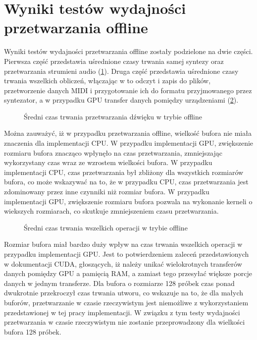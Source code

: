 \section{Wyniki testów wydajności przetwarzania offline}
Wyniki testów wydajności przetwarzania offline zostały podzielone na dwie części. Pierwsza część przedstawia uśrednione czasy trwania samej syntezy oraz przetwarzania strumieni audio (\ref{fig:Średni czas trwania przetwarzania dźwięku w trybie offline}). Druga część przedstawia uśrednione czasy trwania wszelkich obliczeń, włączając w to odczyt i zapis do plików, przetworzenie danych MIDI i przygotowanie ich do formatu przyjmowanego przez syntezator, a w przypadku GPU transfer danych pomiędzy urządzeniami (\ref{fig:Średni czas trwania wszelkich operacji w trybie offline}).

\begin{figure}[H]
    \centering
    \scalebox{1.0}{}
    \caption{Średni czas trwania przetwarzania dźwięku w trybie offline}
    \label{fig:Średni czas trwania przetwarzania dźwięku w trybie offline}
\end{figure}

Można zauważyć, iż w przypadku przetwarzania offline, wielkość bufora nie miała znaczenia dla implementacji CPU. W przypadku implementacji GPU, zwiększenie rozmiaru bufora znacząco wpłynęło na czas przetwarzania, zmniejszając wykorzystany czas wraz ze wzrostem wielkości bufora. W przypadku implementacji CPU, czas przetwarzania był zbliżony dla wszystkich rozmiarów bufora, co może wskazywać na to, że w przypadku CPU, czas przetwarzania jest zdominowany przez inne czynniki niż rozmiar bufora. W przypadku implementacji GPU, zwiększenie rozmiaru bufora pozwala na wykonanie kerneli o wiekszych rozmiarach, co skutkuje zmniejszeniem czasu przetwarzania.

\begin{figure}[H]
    \centering
    \scalebox{1.0}{}
    \caption{Średni czas trwania wszelkich operacji w trybie offline}
    \label{fig:Średni czas trwania wszelkich operacji w trybie offline}
\end{figure}

Rozmiar bufora miał bardzo duży wpływ na czas trwania wszelkich operacji w przypadku implementacji GPU. Jest to potwierdzeniem zaleceń przedstawionych w dokumentacji CUDA\cite{bib:CUDA}, głoszących, iż należy unikać wielokrotnych transferów danych pomiędzy GPU a pamięcią RAM, a zamiast tego przesyłać większe porcje danych w jednym transferze. Dla bufora o rozmiarze 128 próbek czas ponad dwukrotnie przekroczył czas trwania utworu, co wskazuje na to, że dla małych buforów, przetwarzanie w czasie rzeczywistym jest niemożliwe z wykorzystaniem przedstawionej w tej pracy implementacji. W związku z tym testy wydajności przetwarzania w czasie rzeczywistym nie zostanie przeprowadzony dla wielkości bufora 128 próbek.

